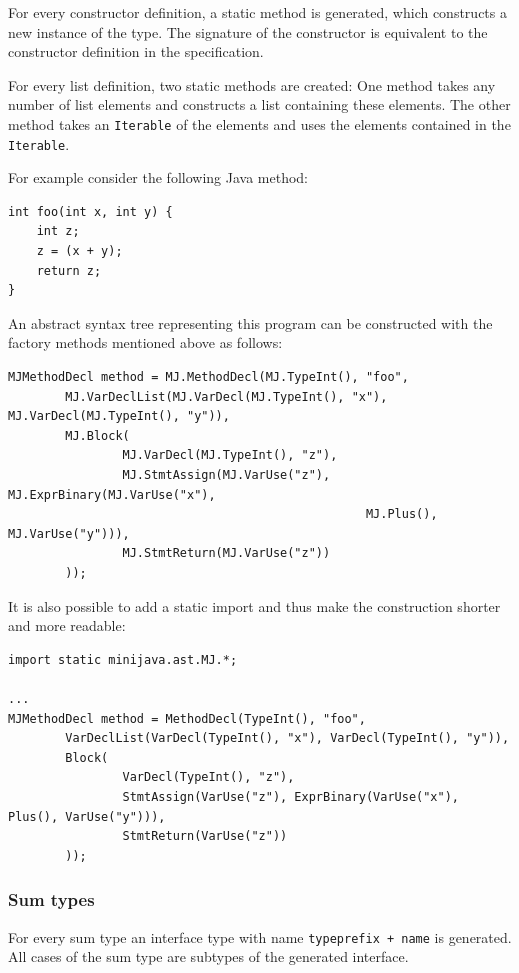 \documentclass{scrartcl}
\begin{document}
For every constructor definition, a static method is generated, which constructs a new instance of the type.
The signature of the constructor is equivalent to the constructor definition in the specification.

For every list definition, two static methods are created:
One method takes any number of list elements and constructs a list containing these elements.
The other method takes an \lstinline!Iterable! of the elements and uses the elements contained in the \lstinline!Iterable!.


For example consider the following Java method:

\begin{lstlisting}
int foo(int x, int y) {
    int z;
    z = (x + y);
    return z;
}
\end{lstlisting}

An abstract syntax tree representing this program can be constructed with the factory methods mentioned above as follows:

\begin{lstlisting}
MJMethodDecl method = MJ.MethodDecl(MJ.TypeInt(), "foo",
        MJ.VarDeclList(MJ.VarDecl(MJ.TypeInt(), "x"), MJ.VarDecl(MJ.TypeInt(), "y")),
        MJ.Block(
                MJ.VarDecl(MJ.TypeInt(), "z"),
                MJ.StmtAssign(MJ.VarUse("z"), MJ.ExprBinary(MJ.VarUse("x"),
                                                  MJ.Plus(), MJ.VarUse("y"))),
                MJ.StmtReturn(MJ.VarUse("z"))
        ));
\end{lstlisting}


It is also possible to add a static import and thus make the construction shorter and more readable:

\begin{lstlisting}
import static minijava.ast.MJ.*;

...
MJMethodDecl method = MethodDecl(TypeInt(), "foo",
        VarDeclList(VarDecl(TypeInt(), "x"), VarDecl(TypeInt(), "y")),
        Block(
                VarDecl(TypeInt(), "z"),
                StmtAssign(VarUse("z"), ExprBinary(VarUse("x"), Plus(), VarUse("y"))),
                StmtReturn(VarUse("z"))
        ));
\end{lstlisting}

\subsubsection{Sum types}

For every sum type an interface type with name \lstinline!typeprefix + name! is generated.
All cases of the sum type are subtypes of the generated interface.
\end{document}
